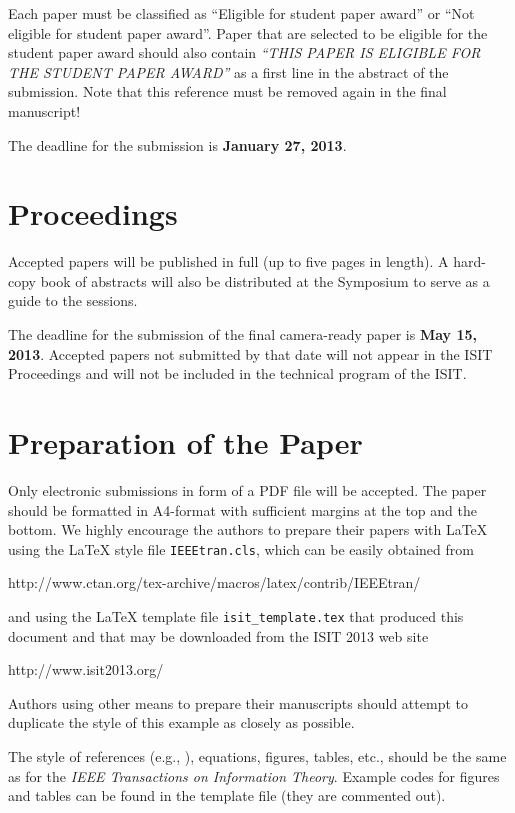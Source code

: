\documentclass[conference,a4paper]{IEEEtran}
\begin{document}
Each paper must be classified as ``Eligible for student paper award''
or ``Not eligible for student paper award''. Paper that are selected
to be eligible for the student paper award should also contain
\emph{``THIS PAPER IS ELIGIBLE FOR THE STUDENT PAPER AWARD''} as a
first line in the abstract of the submission. Note that this reference
must be removed again in the final manuscript!

The deadline for the submission is \textbf{January 27, 2013}.


\section{Proceedings}

Accepted papers will be published in full (up to five pages in
length). A hard-copy book of abstracts will also be distributed at the
Symposium to serve as a guide to the sessions.

The deadline for the submission of the final camera-ready paper is
\textbf{May 15, 2013}.  Accepted papers not submitted by that date
will not appear in the ISIT Proceedings and will not be included in
the technical program of the ISIT.


\section{Preparation of the Paper}

Only electronic submissions in form of a PDF file will be accepted.
The paper should be formatted in A4-format with sufficient margins at
the top and the bottom.  We highly encourage the authors to prepare
their papers with \LaTeX{} using the \LaTeX{} style file
\verb+IEEEtran.cls+, which can be easily obtained from
\begin{center}
  \small
  http://www.ctan.org/tex-archive/macros/latex/contrib/IEEEtran/
\end{center}
and using the \LaTeX{} template file \verb+isit_template.tex+ that
produced this document and that may be downloaded from the ISIT 2013
web site
\begin{center}
  http://www.isit2013.org/
\end{center}
Authors using other means to prepare their manuscripts should attempt
to duplicate the style of this example as closely as possible.

The style of references (e.g., \cite{shannon1948}), equations,
figures, tables, etc., should be the same as for the \emph{IEEE
  Transactions on Information Theory}. Example codes for figures and
tables can be found in the template file (they are commented out).
\end{document}
